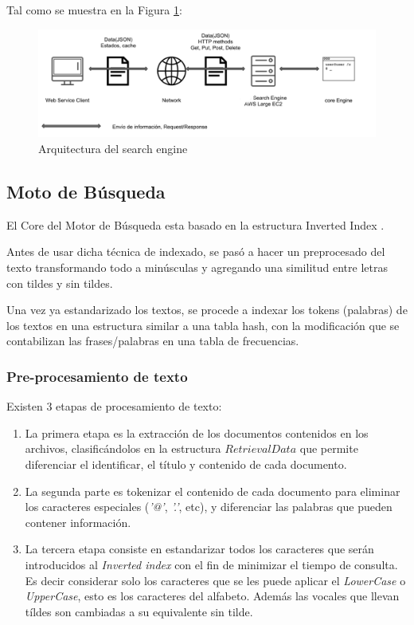 \documentclass[a4paper]{article}
\begin{document}
Tal como se muestra en la Figura \ref{figarchengine}:

\begin{figure}[H]
  \centering
  \includegraphics[width=16cm]{images/architecture.png}
  \caption{Arquitectura del search engine}
  \label{figarchengine}
\end{figure}

\subsection{Moto de Búsqueda}

El Core del Motor de Búsqueda esta basado en la estructura Inverted Index \cite{inverted_index}. 

Antes de usar dicha técnica de indexado, se pasó a hacer un preprocesado del texto transformando todo a minúsculas y agregando una similitud entre letras con tildes y sin tildes.

Una vez ya estandarizado los textos, se procede a indexar los tokens (palabras) de los textos en una estructura similar a una tabla hash, con la modificación que se contabilizan las frases/palabras en una tabla de frecuencias.

\subsubsection{Pre-procesamiento de texto}

Existen 3 etapas de procesamiento de texto:
\begin{enumerate}
    \item La primera etapa es la extracción de los documentos contenidos en los archivos, clasificándolos en la estructura $RetrievalData$ que permite diferenciar el identificar, el título y contenido de cada documento.
    \item La segunda parte es tokenizar el contenido de cada documento para eliminar los caracteres especiales (\textit{'@'}, \textit{'.'}, etc), y diferenciar las palabras que pueden contener información.
    \item La tercera etapa consiste en estandarizar todos los caracteres que serán introducidos al \textit{Inverted index} con el fin de minimizar el tiempo de consulta. Es decir considerar solo los caracteres que se les puede aplicar el \textit{LowerCase} o \textit{UpperCase}, esto es los caracteres del alfabeto. Además las vocales que llevan tíldes son cambiadas a su equivalente sin tilde.
    
\end{enumerate}
\end{document}
